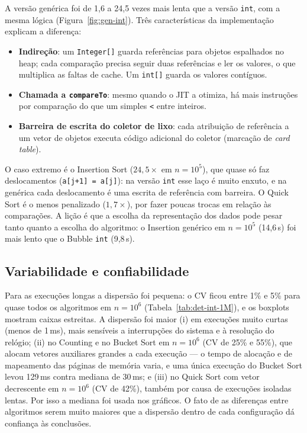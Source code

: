 \documentclass[11pt,a4paper]{article}
\begin{document}
A versão genérica foi de 1,6 a 24,5 vezes mais lenta que a versão \texttt{int}, com a mesma lógica
(Figura~\ref{fig:gen-int}). Três características da implementação explicam a diferença:
\begin{itemize}
  \item \textbf{Indireção}: um \texttt{Integer[]} guarda referências para objetos espalhados no heap;
        cada comparação precisa seguir duas referências e ler os valores, o que multiplica as faltas
        de cache. Um \texttt{int[]} guarda os valores contíguos.
  \item \textbf{Chamada a \texttt{compareTo}}: mesmo quando o JIT a otimiza, há mais instruções por
        comparação do que um simples \texttt{<} entre inteiros.
  \item \textbf{Barreira de escrita do coletor de lixo}: cada atribuição de referência a um vetor de
        objetos executa código adicional do coletor (marcação de \emph{card table}).
\end{itemize}
O caso extremo é o Insertion Sort ($24,5\times$ em $n=10^5$), que quase só faz deslocamentos
(\texttt{a[j+1] = a[j]}): na versão \texttt{int} esse laço é muito enxuto, e na genérica cada
deslocamento é uma escrita de referência com barreira. O Quick Sort é o menos penalizado
($1{,}7\times$), por fazer poucas trocas em relação às comparações. A lição é que a escolha
da representação dos dados pode pesar tanto quanto a escolha do algoritmo: o Insertion genérico
em $n=10^5$ (14,6\,s) foi mais lento que o Bubble \texttt{int} (9,8\,s).

\subsection{Variabilidade e confiabilidade}

Para as execuções longas a dispersão foi pequena: o CV ficou entre 1\% e 5\% para quase todos os
algoritmos em $n=10^6$ (Tabela~\ref{tab:det-int-1M}), e os boxplots mostram caixas estreitas. A
dispersão foi maior (i) em execuções muito curtas (menos de 1\,ms), mais sensíveis a interrupções
do sistema e à resolução do relógio; (ii) no Counting e no Bucket Sort em $n=10^6$ (CV de 25\% e
55\%), que alocam vetores auxiliares grandes a cada execução --- o tempo de alocação e de
mapeamento das páginas de memória varia, e uma única execução do Bucket Sort levou 129\,ms contra
mediana de 30\,ms; e (iii) no Quick Sort com vetor decrescente em $n=10^6$ (CV de 42\%), também por
causa de execuções isoladas lentas. Por isso a mediana foi usada nos gráficos. O fato de as
diferenças entre algoritmos serem muito maiores que a dispersão dentro de cada configuração dá
confiança às conclusões.
\end{document}
